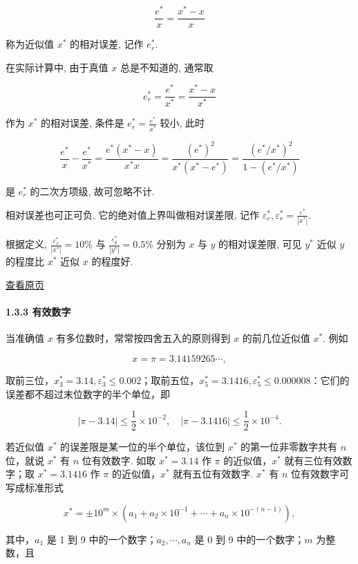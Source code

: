 \documentclass[
  10pt,
  fontset=fandol]{ctexart}
\begin{document}
\[
\frac{e^*}{x} = \frac{x^* - x}{x}
\]

称为近似值 \(x^*\) 的相对误差, 记作 \(e_r^*\).

在实际计算中, 由于真值 \(x\) 总是不知道的, 通常取

\[
e_r^* = \frac{e^*}{x^*} = \frac{x^* - x}{x^*}
\]

作为 \(x^*\) 的相对误差, 条件是 \(e_r^* = \frac{e^*}{x^*}\) 较小, 此时

\[
\frac{e^*}{x} - \frac{e^*}{x^*} = \frac{e^* (x^* - x)}{x^* x} = \frac{(e^*)^2}{x^* (x^* - e^*)} = \frac{(e^* / x^*)^2}{1 - (e^* / x^*)}
\]

是 \(e_r^*\) 的二次方项级, 故可忽略不计.

相对误差也可正可负, 它的绝对值上界叫做相对误差限, 记作 \(\varepsilon_r^*, \varepsilon_r^* = \frac{\varepsilon^*}{|x^*|}\).

根据定义, \(\frac{\varepsilon_x^*}{|x^*|} = 10\%\) 与 \(\frac{\varepsilon_y^*}{|y^*|} = 0.5\%\) 分别为 \(x\) 与 \(y\) 的相对误差限, 可见 \(y^*\) 近似 \(y\) 的程度比 \(x^*\) 近似 \(x\) 的程度好.

\href{../../source-images/pdf-019.jpeg}{查看原页}

\paragraph{1.3.3 有效数字}\label{ux6709ux6548ux6570ux5b57}

当准确值 \(x\) 有多位数时，常常按四舍五入的原则得到 \(x\) 的前几位近似值 \(x^*\). 例如

\[
x = \pi = 3.14159265\cdots,
\]

取前三位，\(x_3^* = 3.14, \varepsilon_3^* \leqslant 0.002\)；取前五位，\(x_5^* = 3.1416, \varepsilon_5^* \leqslant 0.000008\)：它们的误差都不超过末位数字的半个单位，即

\[
|\pi - 3.14| \leqslant \frac{1}{2} \times 10^{-2}, \quad |\pi - 3.1416| \leqslant \frac{1}{2} \times 10^{-4}.
\]

若近似值 \(x^*\) 的误差限是某一位的半个单位，该位到 \(x^*\) 的第一位非零数字共有 \(n\) 位，就说 \(x^*\) 有 \(n\) 位有效数字. 如取 \(x^* = 3.14\) 作 \(\pi\) 的近似值，\(x^*\) 就有三位有效数字；取 \(x^* = 3.1416\) 作 \(\pi\) 的近似值，\(x^*\) 就有五位有效数字. \(x^*\) 有 \(n\) 位有效数字可写成标准形式

\[
x^* = \pm 10^m \times (a_1 + a_2 \times 10^{-1} + \cdots + a_n \times 10^{-(n-1)}), \tag{1.3.1}
\]

其中，\(a_1\) 是 1 到 9 中的一个数字；\(a_2, \cdots, a_n\) 是 0 到 9 中的一个数字；\(m\) 为整数，且
\end{document}
